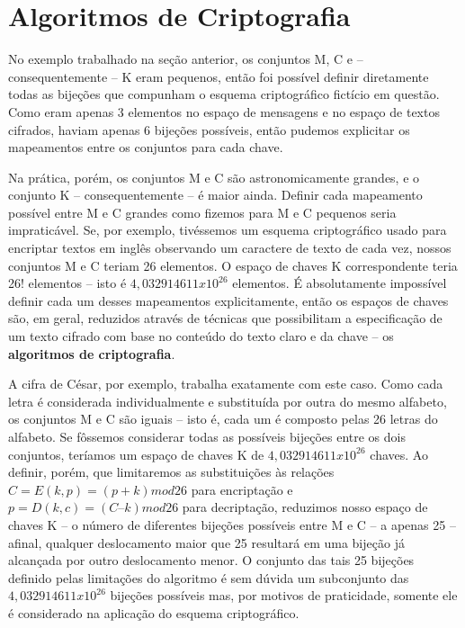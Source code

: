 \documentclass[
	10pt,				%
	openright,			%
	twoside,			%
	a5paper,			%
	english,			%
	french,				%
	spanish,			%
	brazil,				%
	sumario=tradicional
]{abntex2}
\begin{document}
\section{Algoritmos de Criptografia}
No exemplo trabalhado na seção anterior, os conjuntos M, C e – consequentemente – K eram pequenos, então foi possível definir diretamente todas as bijeções que compunham o esquema criptográfico fictício em questão. Como eram apenas 3 elementos no espaço de mensagens e no espaço de textos cifrados, haviam apenas 6 bijeções possíveis, então pudemos explicitar os mapeamentos entre os conjuntos para cada chave.

Na prática, porém, os conjuntos M e C são astronomicamente grandes, e o conjunto K – consequentemente – é maior ainda. Definir cada mapeamento possível entre M e C grandes como fizemos para M e C pequenos seria impraticável. Se, por exemplo, tivéssemos um esquema criptográfico usado para encriptar textos em inglês observando um caractere de texto de cada vez, nossos conjuntos M e C teriam 26 elementos. O espaço de chaves K correspondente teria 26! elementos – isto é $4,032914611 x 10^26$ elementos. É absolutamente impossível definir cada um desses mapeamentos explicitamente, então os espaços de chaves são, em geral, reduzidos através de técnicas que possibilitam a especificação de um texto cifrado com base no conteúdo do texto claro e da chave – os \textbf{algoritmos de criptografia}.

A cifra de César, por exemplo, trabalha exatamente com este caso. Como cada letra é considerada individualmente e substituída por outra do mesmo alfabeto, os conjuntos M e C são iguais – isto é, cada um é composto pelas 26 letras do alfabeto. Se fôssemos considerar todas as possíveis bijeções entre os dois conjuntos, teríamos um espaço de chaves K de $4,032914611 x 10^26$ chaves. Ao definir, porém, que limitaremos as substituições às relações $C = E(k, p) = (p + k) mod 26$ para encriptação e $p = D(k, c) = (C – k) mod 26$ para decriptação, reduzimos nosso espaço de chaves K – o número de diferentes bijeções possíveis entre M e C – a apenas 25 – afinal, qualquer deslocamento maior que 25 resultará em uma bijeção já alcançada por outro deslocamento menor. O conjunto das tais 25 bijeções definido pelas limitações do algoritmo é sem dúvida um subconjunto das $4,032914611 x 10^26$ bijeções possíveis mas, por motivos de praticidade, somente ele é considerado na aplicação do esquema criptográfico.
\end{document}
